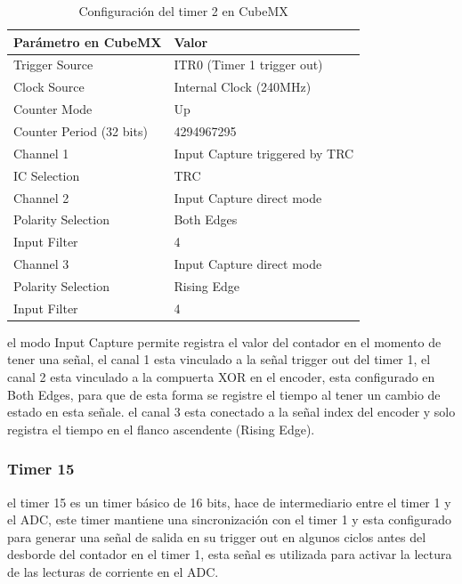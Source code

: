 \documentclass[11pt]{report}
\begin{document}
\begin{table}[h!]
	\centering
	\begin{tabular}{| l | l |}
		\hline
		\textbf{Parámetro en CubeMX} & \textbf{Valor}                 \\
		\hline
		Trigger Source               & ITR0 (Timer 1 trigger out)     \\
		Clock Source                 & Internal Clock (240MHz)        \\
		Counter Mode                 & Up                             \\
		Counter Period (32 bits)     & 4294967295                     \\
		\hline
		Channel 1                    & Input Capture triggered by TRC \\
		IC Selection                 & TRC                            \\
		\hline
		Channel 2                    & Input Capture direct mode      \\
		Polarity Selection           & Both Edges                     \\
		Input Filter                 & 4                              \\
		\hline
		Channel 3                    & Input Capture direct mode      \\
		Polarity Selection           & Rising Edge                    \\
		Input Filter                 & 4                              \\
		\hline
	\end{tabular}
	\caption{Configuración del timer 2 en CubeMX}
	\label{TIM2_config}
\end{table}
\FloatBarrier

el modo Input Capture permite registra el valor del contador en el momento de tener una señal, el canal 1 esta vinculado a la señal trigger out del timer 1, el canal 2 esta vinculado a la compuerta XOR en el encoder, esta configurado en Both Edges, para que de esta forma se registre el tiempo al tener un cambio de estado en esta señale. el canal 3 esta conectado a la señal index del encoder y solo registra el tiempo en el flanco ascendente (Rising Edge).

\subsubsection{Timer 15}

el timer 15 es un timer básico de 16 bits, hace de intermediario entre el timer 1 y el ADC, este timer mantiene una sincronización con el timer 1 y esta configurado para generar una señal de salida en su trigger out en algunos ciclos antes del desborde del contador en el timer 1, esta señal es utilizada para activar la lectura de las lecturas de corriente en el ADC.
\end{document}
